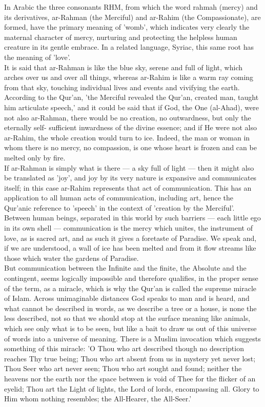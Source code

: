 \documentclass[11pt, b5paper, twoside]{book}
\begin{document}
In Arabic the three consonants RHM, from which the word rahmah (mercy) and its derivatives, ar-Rahman 
(the Merciful) and ar-Rahim (the Compassionate), are formed, have the primary meaning of 'womb', 
which indicates very clearly the maternal character of mercy, nurturing and protecting the helpless 
human creature in its gentle embrace. In a related language, Syriac, this same root has the meaning 
of 'love'. \\

It is said that ar-Rahman is like the blue sky, serene and full of light, which arches over us and 
over all things, whereas ar-Rahim is like a warm ray coming from that sky, touching individual lives 
and events and vivifying the earth. According to the Qur'an, 'the Merciful revealed the Qur'an, 
created man, taught him articulate speech,' and it could be said that if God, the One (al-Ahad), were 
not also ar-Rahman, there would be no creation, no outwardness, but only the eternally self-
sufficient inwardness of the divine essence; and if He were not also ar-Rahim, the whole creation 
would turn to ice. Indeed, the man or woman in whom there is no mercy, no compassion, is one whose 
heart is frozen and can be melted only by fire. \\

If ar-Rahman is simply what is there --- a sky full of light --- then it might also be translated as 
'joy', and joy by its very nature is expansive and communicates itself; in this case ar-Rahim 
represents that act of communication. This has an application to all human acts of communication, 
including art, hence the Qur'anic reference to 'speech' in the context of 'creation by the Merciful'. 
Between human beings, separated in this world by such barriers --- each little ego in its own shell --- 
communication is the mercy which unites, the instrument of love, as is sacred art, and as such it 
gives a foretaste of Paradise. We speak and, if we are understood, a wall of ice has been melted and 
from it flow streams like those which water the gardens of Paradise. \\

But communication between the Infinite and the finite, the Absolute and the contingent, seems 
logically impossible and therefore qualifies, in the proper sense of the term, as a miracle, which is 
why the Qur'an is called the supreme miracle of Islam. Across unimaginable distances God speaks to 
man and is heard, and what cannot be described in words, as we describe a tree or a house, is none 
the less described, not so that we should stop at the surface meaning like animals, which see only 
what is to be seen, but like a bait to draw us out of this universe of words into a universe of 
meaning. There is a Muslim invocation which suggests something of this miracle: 'O Thou who art 
described though no description reaches Thy true being; Thou who art absent from us in mystery yet 
never lost; Thou Seer who art never seen; Thou who art sought and found; neither the heavens nor the 
earth nor the space between is void of Thee for the flicker of an eyelid; Thou art the Light of 
lights, the Lord of lords, encompassing all. Glory to Him whom nothing resembles; the All-Hearer, the 
All-Seer.' \\
\end{document}
